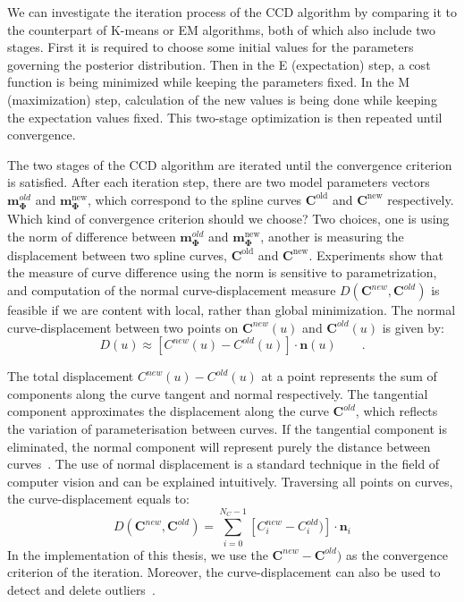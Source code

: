 We can investigate the iteration process of the CCD algorithm by
comparing it to the counterpart of K-means or EM algorithms, both of
which also include two stages. First it is required to choose some
initial values for the parameters governing the posterior
distribution. Then in the E (expectation) step, a cost function is
being minimized while keeping the parameters fixed. In the M (maximization)
step, calculation of the new values is being done while keeping the
expectation values fixed. This two-stage optimization is then repeated
until convergence. 


The two stages of the CCD algorithm are iterated until the convergence
criterion is satisfied. After each iteration step, there are two
model parameters vectors $\mathbf{m}_{\mathbf{\Phi}}^{old}$ and
$\mathbf{m}_{\mathbf{\Phi}}^{\mathrm{new}}$, which correspond to the
spline curves $\mathbf{C}^{\mathrm{old}}$ and
$\mathbf{C}^{\mathrm{new}}$ respectively. Which kind of convergence
criterion should we choose? Two choices, one is using the norm of
difference between $\mathbf{m}_{\mathbf{\Phi}}^{old}$ and
$\mathbf{m}_{\mathbf{\Phi}}^{\mathrm{new}}$, another is measuring
the displacement between two spline curves, $\mathbf{C}^{\mathrm{old}}$ and
$\mathbf{C}^{\mathrm{new}}$. Experiments show that the measure of
curve difference using the norm is sensitive to parametrization, and
computation of the normal curve-displacement measure $D(\mathbf{C}^{new},
\mathbf{C}^{old})$  is feasible if we are content with
local, rather than global minimization. The normal curve-displacement
between two points on $\mathbf{C}^{new}(u)$ and $\mathbf{C}^{old}(u)$ is given by:
\begin{equation}
  \label{eq:normald}
  D(u) \approx
  [C^{new}(u) - C^{old}(u)] \cdot \mathbf{n}(u)\qquad.
\end{equation}

The total displacement $C^{new}(u) - C^{old}(u)$
 at a point represents the sum of components along
the curve tangent and normal respectively. The tangential component
approximates the displacement along the curve
$\mathbf{C}^{old}$, which reflects the variation of parameterisation
between curves. If the tangential component is eliminated, the normal
component will represent purely the distance between curves~\cite{blake1998active}. The
use of normal displacement is a standard technique in the field of computer vision
and can be explained intuitively. 
Traversing all points on curves, the curve-displacement equals to:
\begin{equation}
  \label{eq:bigD}
  D(\mathbf{C}^{new}, \mathbf{C}^{old})  = \sum_{i=0}^{N_{C}-1} [C_{i}^{new} - C_{i}^{old})] \cdot \mathbf{n}_{i}
\end{equation}
In the implementation of this thesis, we use the $\mathbf{C}^{new} -
\mathbf{C}^{old})$ as the convergence criterion of the
iteration. Moreover, the curve-displacement can also be used to detect
and delete outliers~\cite{blake1998active}.

